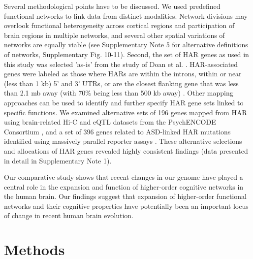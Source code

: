 \begin{refsection}
Several methodological points have to be discussed. We used predefined functional networks to link data from distinct modalities. Network divisions may overlook functional heterogeneity across cortical regions and participation of brain regions in multiple networks, and several other spatial variations of networks are equally viable \citep{smith2009correspondence} (see Supplementary Note 5 for alternative definitions of networks, Supplementary Fig. 10-11). Second, the set of HAR genes as used in this study was selected 'as-is' from the study of Doan et al. \citep{doan2016mutations}. HAR-associated genes were labeled as those where HARs are within the introns, within or near (less than 1 kb) 5' and 3' UTRs, or are the closest flanking gene that was less than 2.1 mb away (with 70\% being less than 500 kb away) \citep{doan2016mutations}. Other mapping approaches can be used to identify and further specify HAR gene sets linked to specific functions. We examined alternative sets of 196 genes mapped from HAR using brain-related Hi-C and eQTL datasets from the PsychENCODE Consortium \citep{wang2018comprehensive}, and a set of 396 genes related to ASD-linked HAR mutations identified using massively parallel reporter assays \citep{doan2016mutations}. These alternative selections and allocations of HAR genes revealed highly consistent findings (data presented in detail in Supplementary Note 1).

Our comparative study shows that recent changes in our genome have played a central role in the expansion and function of higher-order cognitive networks in the human brain. Our findings suggest that expansion of higher-order functional networks and their cognitive properties have potentially been an important locus of change in recent human brain evolution.

\section*{Methods}

\end{refsection}
